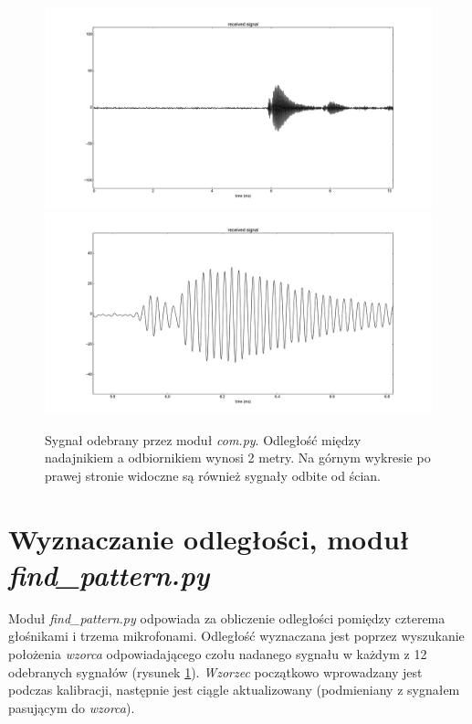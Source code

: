 \begin{figure}[h!]
    \centering
    \includegraphics[width=1.15\textwidth, trim= 47mm 0mm 0mm 0mm,clip]{com_output_2m_1}
    \includegraphics[width=1.15\textwidth, trim= 47mm 0mm 0mm 0mm,clip]{com_output_2m_2}
    \caption{Sygnał odebrany przez moduł \textit{com.py}. 
    Odległość między nadajnikiem a odbiornikiem wynosi 2 metry.
    Na górnym wykresie po prawej stronie widoczne są również sygnały odbite od ścian.
    }
    \label{fig:com_output_2m}
\end{figure}

\newpage
\section{Wyznaczanie odległości, moduł \textit{find\_pattern.py}}

Moduł \textit{find\_pattern.py} odpowiada za obliczenie odległości pomiędzy czterema głośnikami i trzema mikrofonami.
Odległość wyznaczana jest poprzez wyszukanie położenia \textit{wzorca} odpowiadającego czołu nadanego sygnału 
w każdym z 12 odebranych sygnałów (rysunek \ref{fig:com_output_2m}).
\textit{Wzorzec} początkowo wprowadzany jest podczas kalibracji, następnie jest ciągle aktualizowany 
(podmieniany z sygnałem pasującym do \textit{wzorca}).

